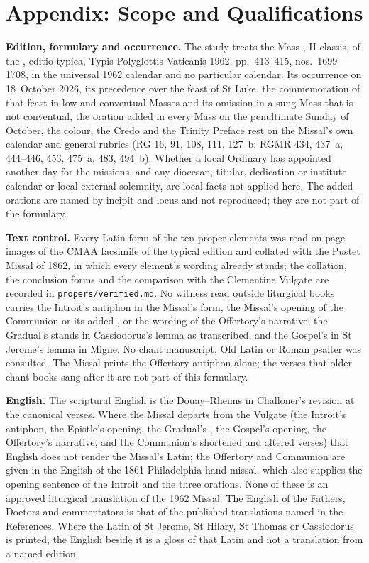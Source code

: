 \section{Appendix: Scope and Qualifications}
\label{sec:scope}

{\small
\textbf{Edition, formulary and occurrence.} The study treats the Mass
, II classis, of the , editio typica, Typis Polyglottis Vaticanis 1962, pp.~413--415,
nos.~1699--1708, in the universal 1962 calendar and no particular calendar. Its
occurrence on 18~October 2026, its precedence over the feast of St Luke, the
commemoration of that feast in low and conventual Masses and its omission in a
sung Mass that is not conventual, the oration  added
in every Mass on the penultimate Sunday of October, the colour, the Credo and the
Trinity Preface rest on the Missal's own calendar and general rubrics (RG 16, 91,
108, 111, 127~b; RGMR 434, 437~a, 444--446, 453, 475~a, 483, 494~b). Whether a local
Ordinary has appointed another day for the missions, and any diocesan, titular,
dedication or institute calendar or local external solemnity, are local facts not
applied here. The added orations are named by incipit and locus and not
reproduced; they are not part of the formulary.

\textbf{Text control.} Every Latin form of the ten proper elements was read on page
images of the CMAA facsimile of the typical edition and collated with the Pustet
Missal of 1862, in which every element's wording already stands; the collation,
the conclusion forms and the comparison with the Clementine Vulgate are recorded
in \texttt{propers/verified.md}. No witness read outside liturgical books carries
the Introit's antiphon in the Missal's form, the Missal's opening of the Communion
or its added , or the wording of the Offertory's narrative;
the Gradual's  stands in Cassiodorus's lemma as
transcribed, and the Gospel's  in St Jerome's lemma in Migne. No
chant manuscript, Old Latin or Roman psalter was consulted. The Missal prints the
Offertory antiphon alone; the verses that older chant books sang after it are not
part of this formulary.

\textbf{English.} The scriptural English is the Douay--Rheims in Challoner's revision
at the canonical verses. Where the Missal departs from the Vulgate (the Introit's
antiphon, the Epistle's opening, the Gradual's , the
Gospel's opening, the Offertory's narrative, and the Communion's shortened and
altered verses) that English does not render the Missal's Latin; the Offertory and
Communion are given in the English of the 1861 Philadelphia hand missal, which also
supplies the opening sentence of the Introit and the three orations. None of these
is an approved liturgical translation of the 1962 Missal. The English of the
Fathers, Doctors and commentators is that of the published translations named in
the References. Where the Latin of St Jerome, St Hilary, St Thomas or Cassiodorus is printed, the
English beside it is a gloss of that Latin and not a translation from a named
edition.

}
